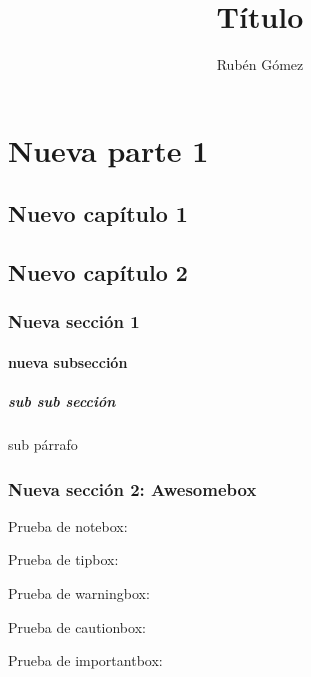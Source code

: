 \documentclass{yukibook}
\title{Título}
\author{Rubén Gómez}
\begin{document}
\maketitle
\tableofcontents

\part{Nueva parte 1}

\chapter{Nuevo capítulo 1}
\Blindtext[2]

\chapter{Nuevo capítulo 2}
\Blindtext[2]

\section{Nueva sección 1}
\Blindtext[2]

\subsection{nueva subsección}
\Blindtext[1]

\subsubsection{sub sub sección}
\Blindtext[1]

\subparagraph{sub párrafo}
\Blindtext[1]

\section{Nueva sección 2: Awesomebox}
Prueba de notebox:
\notebox{\Blindtext[1]}

Prueba de tipbox:
\tipbox{\Blindtext[1]}

Prueba de warningbox:
\warningbox{\Blindtext[1]}

Prueba de cautionbox:
\cautionbox{\Blindtext[1]}

Prueba de importantbox:
\importantbox{\Blindtext[1]}


\begin{info-box}
  \notebox{\Blindtext[1]}
\end{info-box}
\begin{warning-box}
  \Blindtext[1]
\end{warning-box}
\begin{error-box}
  \Blindtext[1]
\end{error-box}
\end{document}
